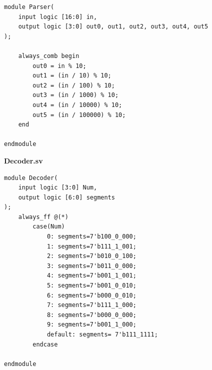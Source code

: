 \documentclass[12pt]{article}
\begin{document}
\begin{verbatim}
module Parser(
    input logic [16:0] in,
    output logic [3:0] out0, out1, out2, out3, out4, out5
);

    always_comb begin
        out0 = in % 10;
        out1 = (in / 10) % 10;
        out2 = (in / 100) % 10;
        out3 = (in / 1000) % 10;
        out4 = (in / 10000) % 10;
        out5 = (in / 100000) % 10;
    end

endmodule
\end{verbatim}

\begin{center}
  \textbf{Decoder.sv}
\end{center}

\begin{verbatim}
module Decoder(
    input logic [3:0] Num,
    output logic [6:0] segments
);
    always_ff @(*)
        case(Num)
            0: segments=7'b100_0_000;
            1: segments=7'b111_1_001;
            2: segments=7'b010_0_100;
            3: segments=7'b011_0_000;
            4: segments=7'b001_1_001;
            5: segments=7'b001_0_010;
            6: segments=7'b000_0_010;
            7: segments=7'b111_1_000;
            8: segments=7'b000_0_000;
            9: segments=7'b001_1_000;
            default: segments= 7'b111_1111;
        endcase

endmodule
\end{verbatim}
\end{document}
